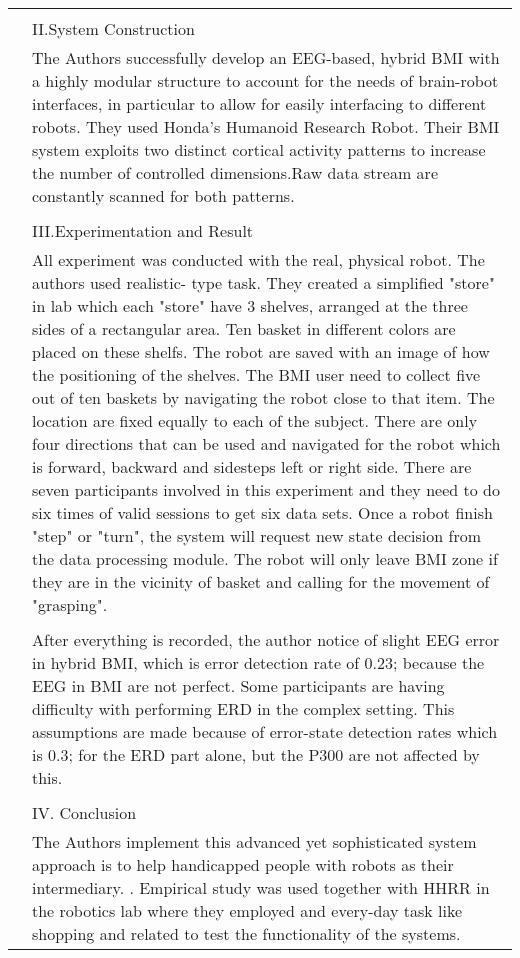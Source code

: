 \documentclass[a4paper, 12pt]{article}
\begin{document}
\begin{tabular}{| m{12em} | m{28em} |}
& \\
& II.System Construction \\
& The Authors successfully develop an EEG-based, hybrid BMI with a highly modular structure 
to account for the needs of brain-robot interfaces, in particular to allow for easily 
interfacing to different robots. They used Honda's Humanoid Research Robot. Their BMI system exploits two distinct cortical activity patterns to increase the number 
of controlled dimensions.Raw data stream are constantly scanned for both patterns.\\
& \\
& III.Experimentation and Result \\
& All experiment was conducted with the real, physical robot. The authors used realistic-
type task. They created a simplified "store" in lab which each "store" have 3 shelves, 
arranged at the three sides of a rectangular area. Ten basket in different colors are 
placed on these shelfs. The robot are saved with an image of how the positioning of the 
shelves. The BMI user need to collect five out of ten baskets by navigating the robot 
close to that item. The location are fixed equally to each of the subject. 
There are only four directions that can be used and navigated for the robot which is 
forward, backward and sidesteps left or right side.  There are seven participants involved in this 
experiment and they need to do six times of valid sessions to get six data sets.  Once a robot finish "step" or "turn", the 
system will request new state decision from the data processing module. The robot will 
only leave BMI zone if they are in the vicinity of basket and calling for the movement of 
"grasping". \\

& \\
& After everything is recorded, the author notice of slight EEG error in hybrid BMI, which 
is error detection rate of 0.23; because the EEG in BMI are not perfect. Some participants 
are having difficulty with performing ERD in the complex setting. This assumptions are 
made because of error-state detection rates which is 0.3; for the ERD part alone, but the 
P300 are not affected by this.  \\
& \\
& IV. Conclusion\\
& The Authors implement this advanced yet sophisticated system approach is to help 
handicapped people with robots as their intermediary. . Empirical study was used together with HHRR in the robotics lab where they employed and 
every-day task like shopping and related to test the functionality of the systems.\\


\end{tabular}
\end{document}

